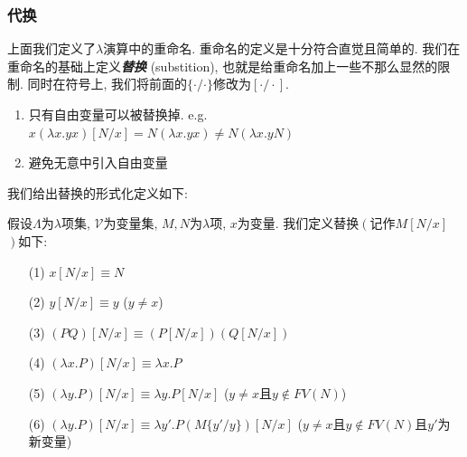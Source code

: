 \subsubsection{代换}
上面我们定义了$\lambda$演算中的重命名. 重命名的定义是十分符合直觉且简单的. 我们在重命名的基础上定义\textbf{\textit{替换}} (substition), 也就是给重命名加上一些不那么显然的限制. 同时在符号上, 我们将前面的$\{\cdot/\cdot\}$修改为$[\cdot/\cdot]$.
\begin{enumerate}
    \item 只有自由变量可以被替换掉. e.g. $x(\lambda x.yx)[N/x]=N  (\lambda{x}.yx) \not= N (\lambda{x}.yN) $
    \item 避免无意中引入自由变量
\end{enumerate}
我们给出替换的形式化定义如下:
\begin{definition}
    假设$\Lambda$为$\lambda$项集, $\mathcal V$为变量集, $M, N$为$\lambda$项, $x$为变量. 我们定义替换$\left(\right.$记作$M[N/x]$ $\left.\right)$如下:
    \begin{enumerate}\normalfont{}
        \item[(1)] $x[N/x]\equiv{N}$
        \item[(2)] $y[N/x]\equiv{y}$ ($y\not=x$)
        \item[(3)] $(PQ)[N/x]\equiv{(P[N/x])(Q[N/x])}$
        \item[(4)] $(\lambda x.P)[N/x]\equiv\lambda x.P$
        \item[(5)] $(\lambda y.P)[N/x]\equiv\lambda y.P[N/x]$ ($y\not=x$且$y\not\in FV(N)$)
        \item[(6)] $(\lambda y.P)[N/x]\equiv\lambda y'.P(M\{y'/y\})[N/x]$ ($y\not=x$且$y\not\in FV(N)$且$y'$为新变量)
    \end{enumerate}
\end{definition}    

